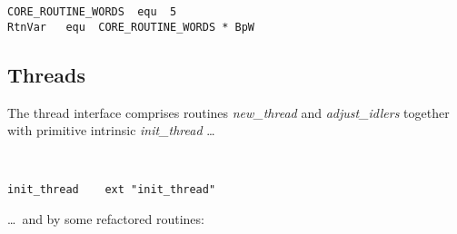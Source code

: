 {\small
\begin{verbatim}
CORE_ROUTINE_WORDS  equ  5
RtnVar   equ  CORE_ROUTINE_WORDS * BpW
\end{verbatim}}



\subsection{Threads}\label{abstractthreads}\label{threadstate}

The thread interface comprises routines \emph{new\_thread} and \emph{adjust\_idlers} together with primitive intrinsic \emph{init\_thread} \dots

\begin{tabbing}
\indents
{}
\\[-30pt]
\end{tabbing}

{\small
\begin{verbatim}
init_thread    ext "init_thread"
\end{verbatim}}

\dots\ and by some refactored routines:

